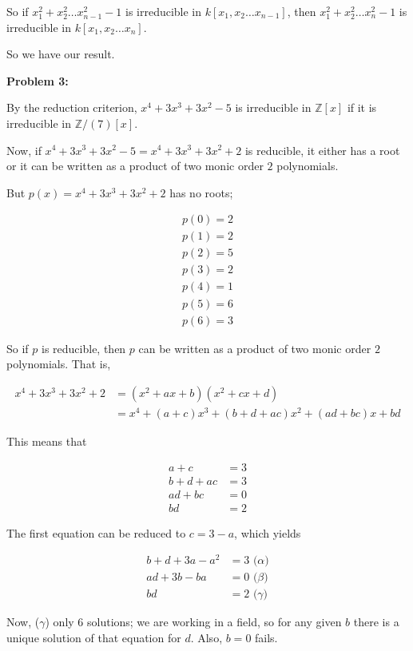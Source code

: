 \documentclass[a4paper,12pt]{article}
\newcommand{\tab}{\hspace{4mm}} %
\newcommand{\shunt}{\vspace{20mm}}
\newcommand{\al}{\alpha} %
\newcommand{\be}{\beta}
\newcommand{\ga}{\gamma}
\newcommand{\Z}{\mathbb{Z}}
\begin{document}
\tab So if $x_1^2 + x_2^2 \ldots x_{n-1}^2 -1$ is irreducible in $k[x_1, x_2 \ldots x_{n-1}]$, then $x_1^2 + x_2^2 \ldots x_{n}^2 -1$ is irreducible in $k[x_1, x_2 \ldots x_{n}]$.

So we have our result. 


\shunt

{\bf Problem 3:}

By the reduction criterion, $x^4 + 3x^3 + 3x^2 -5$ is irreducible in $\Z[x]$ if it is irreducible in $\Z/(7)[x]$.

Now, if $x^4 + 3x^3 + 3x^2 -5 = x^4 + 3x^3 + 3x^2 +2$ is reducible, it either has a root or it can be written as a product of two monic order $2$ polynomials.

But $p(x) = x^4 + 3x^3 + 3x^2 +2$ has no roots; 

\begin{align*}
p(0)=2\\
p(1)=2\\
p(2)=5\\
p(3)=2\\
p(4)=1\\
p(5)=6\\
p(6)=3
\end{align*}

So if $p$ is reducible, then $p$ can be written as a product of two monic order $2$ polynomials. That is, 

\begin{align*}
x^4 + 3x^3 + 3x^2 +2 &= (x^2+ax+b)(x^2+cx+d)\\
&=x^4+(a+c)x^3+(b+d+ac)x^2+(ad+bc)x+bd
\end{align*}

This means that

\begin{align*}
a+c&=3\\
b+d+ac&=3\\
ad+bc&=0\\
bd&=2
\end{align*}

The first equation can be reduced to $c=3-a$, which yields

\begin{align*}
b+d+3a-a^2&=3 \text{ ($\al$)}\\
ad+3b-ba&=0 \text{ ($\be$)}\\
bd&=2 \text{ ($\ga$)}
\end{align*}

Now, ($\ga$) only $6$ solutions; we are working in a field, so for any given $b$ there is a unique solution of that equation for $d$. Also, $b=0$ fails.
\end{document}
